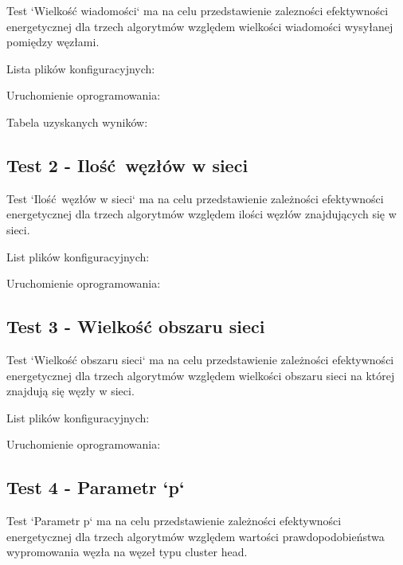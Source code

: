 \documentclass[a4paper,12pt,twoside,openany]{report}
\begin{document}
Test `Wielkość wiadomości` ma na celu przedstawienie zalezności efektywności energetycznej dla trzech algorytmów względem wielkości wiadomości wysyłanej pomiędzy
węzłami.

Lista plików konfiguracyjnych:


Uruchomienie oprogramowania:


Tabela uzyskanych wyników:


\subsection{Test 2 - Ilość węzłów w sieci}

Test `Ilość węzłów w sieci` ma na celu przedstawienie zależności efektywności energetycznej dla trzech algorytmów względem ilości węzłów znajdujących się w sieci.

List plików konfiguracyjnych:


Uruchomienie oprogramowania:


\subsection{Test 3 - Wielkość obszaru sieci}

Test `Wielkość obszaru sieci` ma na celu przedstawienie zależności efektywności energetycznej dla trzech algorytmów względem wielkości obszaru sieci na której
znajdują się węzły w sieci.

List plików konfiguracyjnych:


Uruchomienie oprogramowania:


\subsection{Test 4 - Parametr `p`}

Test `Parametr p` ma na celu przedstawienie zależności efektywności energetycznej dla trzech algorytmów względem wartości prawdopodobieństwa wypromowania węzła na węzeł
typu cluster head. 
\end{document}
